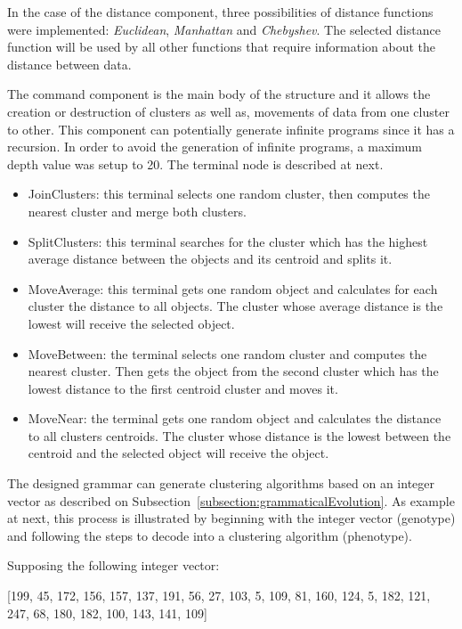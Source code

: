 \documentclass[journal]{IEEEtran}
\begin{document}
	In the case of the distance component, three possibilities of distance functions were implemented: \textit{Euclidean}, \textit{Manhattan} and \textit{Chebyshev}. The selected distance function will be used by all other functions that require information about the distance between data. 
	


	The command component is the main body of the structure and it allows the creation or destruction of clusters as well as, movements of data from one cluster to other.  This component can potentially generate infinite programs since it has a recursion. In order to avoid the generation of infinite programs, a maximum depth value was setup to 20. The  terminal node is described at next.
	
	\begin{itemize}
		\item JoinClusters: this terminal selects one random cluster, then computes the nearest cluster and merge both clusters.
		\item SplitClusters: this terminal searches for the cluster which has the highest average distance between the objects and its centroid and splits it. 
		\item MoveAverage:  this terminal gets one random object and calculates for each cluster the distance to all objects. The cluster whose average distance is the lowest will receive the selected object.
		\item MoveBetween: the terminal selects one random cluster and computes the nearest cluster. Then gets the object from the second cluster which has the lowest distance to the first centroid cluster and moves it.
		\item MoveNear:  the terminal gets one random object and calculates the distance to all clusters centroids. The cluster whose distance is the lowest between the centroid and the selected object will receive the object.
	\end{itemize}
	
	The designed grammar can generate clustering algorithms based on an integer vector as described on Subsection~\ref{subsection:grammaticalEvolution}. As example at next, this process is illustrated by beginning with the integer vector (genotype) and following the steps to decode into a clustering algorithm (phenotype). 
	
	Supposing the following integer vector:
	
	[199, 45, 172, 156, 157, 137, 191, 56, 27, 103, 5, 109, 81, 160, 124, 5, 182, 121, 247, 68, 180, 182, 100, 143, 141, 109]
	
\end{document}
